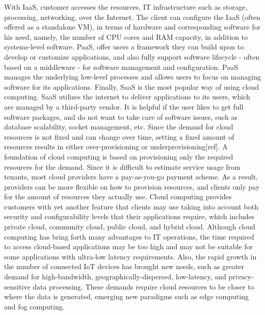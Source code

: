 With IaaS, customer accesses the resources, IT infrastructure such as storage, processing, networking, over the Internet. The client can configure the IaaS (often offered as a standalone VM), in terms of hardware and corresponding software for his need, namely, the number of CPU cores and RAM capacity, in addition to systems-level software. PaaS, offer users a framework they can build upon to develop or customize applications, and also fully support software lifecycle - often based on a middleware - for software management and configuration. PaaS manages the underlying low-level processes and allows users to focus on managing software for its applications. Finally, SaaS is the most popular way of using cloud computing. SaaS utilizes the internet to deliver applications to its users, which are managed by a third-party vendor. It is helpful if the user likes to get full software packages, and do not want to take care of software issues, such as database scalability, socket management, etc. Since the demand for cloud resources is not fixed and can change over time, setting a fixed amount of resources results in either over-provisioning or underprovisioning[ref]. A foundation of cloud computing is based on provisioning only the required resources for the demand. Since it is difficult to estimate service usage from tenants, most cloud providers have a pay-as-you-go payment scheme. As a result, providers can be more flexible on how to provision resources, and clients only pay for the amount of resources they actually use. Cloud computing provides customers with yet another feature that clients may use taking into account both security and configurability levels that their applications require, which includes private cloud, community cloud, public cloud, and hybrid cloud. Although cloud computing has bring forth many advantages to IT operations, the time required to access cloud-based applications may be too high and may not be suitable for some applications with ultra-low latency requirements. Also, the rapid growth in the number of connected IoT devices has brought new needs, such as greater demand for high-bandwidth, geographically-dispersed, low-latency, and privacy-sensitive data processing. These demands require cloud resources to be closer to where the data is generated, emerging new paradigms such as edge computing and fog computing.


